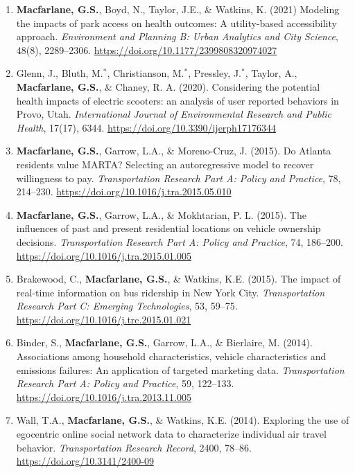 \documentclass[margin,line]{res}
\newif\ifdetail
\newcounter{enuminitialize}
\newenvironment{myenum}[1][]
{%
 \setcounter{enuminitialize}{#1}
 \addtocounter{enuminitialize}{2}
 \begin{enumerate}[left= 4pt, itemsep=8pt, start=\value{enuminitialize}, label=\arabic*\addtocounter{enumi}{-2}]
}
{%
 \end{enumerate}
}
\begin{document}
\begin{resume}
\begin{myenum}[28]
  \item\textbf{Macfarlane, G.S.}, Boyd, N., Taylor, J.E., \& Watkins, K. (2021) Modeling the impacts of park access
on health outcomes: A utility-based accessibility approach. \textit{ Environment and
Planning B: Urban Analytics and City Science}, 48(8), 2289–2306. \url{https://doi.org/10.1177/2399808320974027}
  \ifdetail Citations: 24\fi

  \item Glenn, J., Bluth, M.$^*$, Christianson, M.$^*$, Pressley, J.$^*$, Taylor, A., \textbf{Macfarlane, G.S.}, \& Chaney, R. A. (2020).
  Considering the potential health impacts of electric scooters: an analysis of user reported behaviors in Provo, Utah.
  \textit{ International Journal of Environmental Research and Public Health}, 17(17), 6344. \url{https://doi.org/10.3390/ijerph17176344} \ifdetail Citations: 5  \fi
  \ifdetail Citations: 62\fi

  \item\textbf{Macfarlane, G.S.}, Garrow, L.A., \& Moreno-Cruz, J. (2015). Do Atlanta
residents value MARTA? Selecting an autoregressive model to recover willingness
to pay. \textit{ Transportation Research Part A: Policy and Practice}, 78, 214–230.
\url{https://doi.org/10.1016/j.tra.2015.05.010} \ifdetail Citations: 9 \fi

  \item\textbf{Macfarlane, G.S.}, Garrow, L.A., \& Mokhtarian, P. L. (2015). The influences of
past and present residential locations on vehicle ownership decisions.
\textit{ Transportation Research Part A: Policy and Practice}, 74, 186–200.
\url{https://doi.org/10.1016/j.tra.2015.01.005} \ifdetail Citations: 52  \fi

  \item Brakewood, C., \textbf{Macfarlane, G.S.}, \& Watkins, K.E. (2015). The impact of
real-time information on bus ridership in New York City. \textit{ Transportation Research
Part C: Emerging Technologies}, 53, 59–75. \url{https://doi.org/10.1016/j.trc.2015.01.021} 
\ifdetail Citations: 203 \fi

  \item Binder, S., \textbf{Macfarlane, G.S.}, Garrow, L.A., \& Bierlaire, M. (2014).
Associations among household characteristics, vehicle characteristics and
emissions failures: An application of targeted marketing data. \textit{ Transportation
Research Part A: Policy and Practice}, 59, 122–133.
\url{https://doi.org/10.1016/j.tra.2013.11.005}\ifdetail Citations: 24 \fi

  \item Wall, T.A., \textbf{Macfarlane, G.S.}, \& Watkins, K.E. (2014). Exploring the use of
egocentric online social network data to characterize individual air travel
behavior. \textit{ Transportation Research Record}, 2400, 78–86.
\url{https://doi.org/10.3141/2400-09} \ifdetail Citations: 14  \fi


\end{myenum}
\end{resume}
\end{document}
